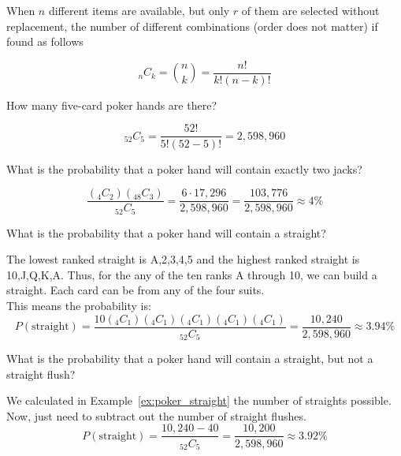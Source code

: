 \documentclass{beamer}
\newcommand{\prob}[1]{P\left(#1\right)}
\newcommand{\comb}[2]{_{#1}C_{#2}}
\begin{document}
\begin{frame}
\begin{definition}
When $n$ different items are available, but only $r$ of them are selected without replacement, the number of different combinations (order does not matter) if found as follows

\vspace{-4mm}
\begin{equation*}
\comb{n}{k}=\binom{n}{k} = \dfrac{n!}{k!\left(n-k\right)!}
\end{equation*}
\end{definition}\pause

\begin{example}
How many five-card poker hands are there?\pause

\begin{equation*}
\comb{52}{5} = \dfrac{52!}{5!\left(52-5\right)!} = 2,598,960
\end{equation*}
\end{example}\pause

\begin{example}\label{ex:poker_straight}
What is the probability that a poker hand will contain exactly two jacks?\pause

\begin{equation*}
\dfrac{\left(\comb{4}{2}\right)\left(\comb{48}{3}\right)}{\comb{52}{5}} = \dfrac{6\cdot17,296}{2,598,960} = \dfrac{103,776}{2,598,960} \approx 4\%
\end{equation*}
\end{example}
\end{frame}

\begin{frame}
\begin{example}
What is the probability that a poker hand will contain a straight?\pause

\vspace{2mm}
The lowest ranked straight is A,2,3,4,5 and the highest ranked straight is 10,J,Q,K,A. Thus, for the any of the ten ranks A through 10, we can build a straight. Each card can be from any of the four suits.\\ This means the probability is:
\begin{equation*}
\prob{\text{straight}} = \dfrac{10\left(\comb{4}{1}\right)\left(\comb{4}{1}\right)\left(\comb{4}{1}\right)\left(\comb{4}{1}\right)\left(\comb{4}{1}\right)}{\comb{52}{5}} = \dfrac{10,240}{2,598,960} \approx 3.94\%
\end{equation*}
\end{example}\pause

\begin{example}
What is the probability that a poker hand will contain a straight, but not a straight flush?\pause

We calculated in Example~\ref{ex:poker_straight} the number of straights possible. Now, just need to subtract out the number of straight flushes.
\begin{equation*}
\prob{\text{straight}} = \dfrac{10,240 - 40}{\comb{52}{5}} = \dfrac{10,200}{2,598,960} \approx 3.92\%
\end{equation*}

\end{example}
\end{frame}
\end{document}
